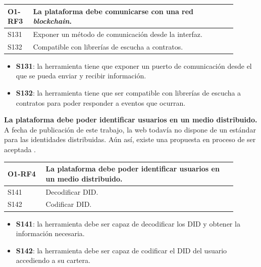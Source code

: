 \begin{center}
    \begin{table}[h!]
        \begin{tabular}{|p{0.1\linewidth} | p{0.8\linewidth}|}
            \hline
             
            \textbf{O1-RF3} & \textbf{La plataforma debe comunicarse con una red \textit{blockchain}.} \\
            \hline
            S131            & Exponer un método de comunicación desde la interfaz. \\
            \hline
            S132            & Compatible con librerías de escucha a contratos. \\
            \hline
        \end{tabular}
    \end{table}
\end{center}
\begin{itemize}
    \item \textbf{S131}: la herramienta tiene que exponer un puerto de comunicación desde el que se pueda enviar y recibir información.
    \item \textbf{S132}: la herramienta tiene que ser compatible con librerías de escucha a contratos para poder responder a eventos que ocurran.
\end{itemize}
\textbf{La plataforma debe poder identificar usuarios en un medio distribuido.}\\
A fecha de publicación de este trabajo, la web todavía no dispone de un estándar para las identidades distribuidas. Aún así, existe una propuesta en proceso de ser aceptada \cite{web:did-spec}.
\begin{center}
    \begin{table}[h!]
        \begin{tabular}{|p{0.15\linewidth} | p{0.75\linewidth}|}
            \hline
             
            \textbf{O1-RF4} & \textbf{La plataforma debe poder identificar usuarios en un medio distribuido.} \\
            \hline
            S141            & Decodificar DID. \\
            \hline
            S142            & Codificar DID. \\
            \hline
        \end{tabular}
    \end{table}
\end{center}
\begin{itemize}
    \item \textbf{S141}: la herramienta debe ser capaz de decodificar los DID y obtener la información necesaria.
    \item \textbf{S142}: la herramienta debe ser capaz de codificar el DID del usuario accediendo a su cartera.
\end{itemize}
